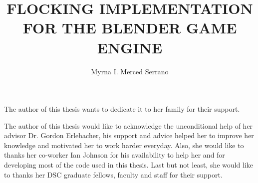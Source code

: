 \documentclass[11pt]{fsuthesis}
\title{FLOCKING IMPLEMENTATION FOR THE BLENDER GAME ENGINE}
\author{Myrna I. Merced Serrano}
\begin{document}
\frontmatter
\maketitle
\makesignaturepage

\begin{dedication}
The author of this thesis wants to dedicate it to her family for their support.
\end{dedication}

\begin{acknowledgments}
The author of this thesis would like to acknowledge the unconditional help of her advisor Dr. Gordon Erlebacher, his support and advice helped her to improve her knowledge and motivated her to work harder everyday. Also, she would like to thanks her co-worker Ian Johnson for his availability to help her and for developing most of the code used in this thesis. Last but not least, she would like to thanks her DSC graduate fellows, faculty and staff for their support.
\end{acknowledgments}

\tableofcontents
\listoftables
\listoffigures






\onehalfspacing
\end{document}
